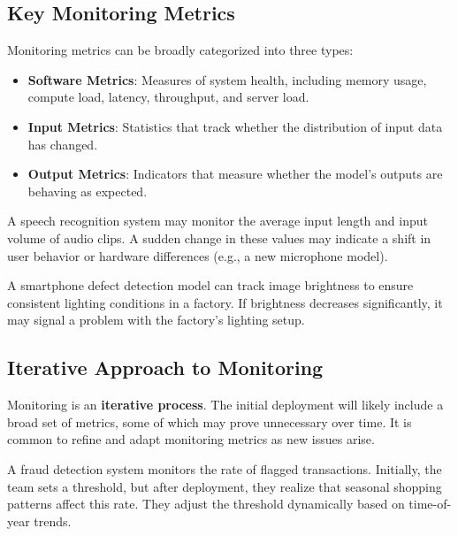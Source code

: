 \documentclass[12pt,openany]{book}
\begin{document}
\subsection{Key Monitoring Metrics}

Monitoring metrics can be broadly categorized into three types:

\begin{itemize}
    \item \textbf{Software Metrics}: Measures of system health, including memory usage, compute load, latency, throughput, and server load.
    \item \textbf{Input Metrics}: Statistics that track whether the distribution of input data has changed.
    \item \textbf{Output Metrics}: Indicators that measure whether the model's outputs are behaving as expected.
\end{itemize}

\noindent\begin{minipage}{\textwidth}
\begin{examplebox}
   A speech recognition system may monitor the average input length and input volume of audio clips. A sudden change in these values may indicate a shift in user behavior or hardware differences (e.g., a new microphone model).
\end{examplebox}
\end{minipage}

\begin{examplebox}
   A smartphone defect detection model can track image brightness to ensure consistent lighting conditions in a factory. If brightness decreases significantly, it may signal a problem with the factory's lighting setup.
\end{examplebox}


\subsection{Iterative Approach to Monitoring}

Monitoring is an \textbf{iterative process}. The initial deployment will likely include a broad set of metrics, some of which may prove unnecessary over time. It is common to refine and adapt monitoring metrics as new issues arise.

\begin{examplebox}
   A fraud detection system monitors the rate of flagged transactions. Initially, the team sets a threshold, but after deployment, they realize that seasonal shopping patterns affect this rate. They adjust the threshold dynamically based on time-of-year trends.
\end{examplebox}
\end{document}
